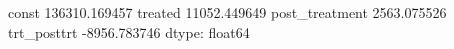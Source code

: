 const             136310.169457
treated            11052.449649
post_treatment      2563.075526
trt_posttrt        -8956.783746
dtype: float64
